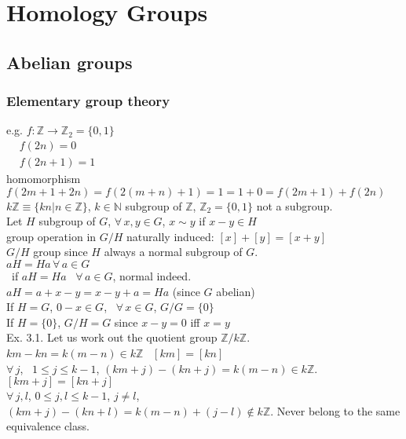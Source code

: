 \documentclass{book}
\begin{document}
\chapter{Homology Groups} 

\section{Abelian groups}

\subsection{Elementary group theory}

e.g. $f: \mathbb{Z} \to \mathbb{Z}_2 = \lbrace 0 , 1 \rbrace$ \\
$\begin{aligned}
  & f(2n) = 0 \\ 
  & f(2n+1) = 1 \end{aligned}$  \\
homomorphism $f(2m+1 +2n) = f(2(m+n) + 1) = 1 = 1 + 0 = f(2m+1) + f(2n)$ \\
$k\mathbb{Z} \equiv \lbrace kn | n \in \mathbb{Z} \rbrace$, $k \in \mathbb{N}$ subgroup of $\mathbb{Z}$, $\mathbb{Z}_2 = \lbrace 0 ,1 \rbrace$ not a subgroup.  \\

Let $H$ subgroup of $G$, $\forall \, x, y \in G$, $x\sim y$ if $x- y \in H$ \\
group operation in $G/H$ naturally induced: $[x] + [y] = [x+y]$ \\
$G/H$ group since $H$ always a normal subgroup of $G$.  \\
\quad $aH = Ha \, \forall \, a \in G$ \\
\quad \, if $aH = Ha$ \, $\forall \, a \in G$, normal indeed.  \\
\quad $aH = a + x - y = x - y + a = Ha$ (since $G$ abelian) \\

If $H = G$, $0-x \in G$, \, $\forall \, x \in G$, $G/G = \lbrace  0 \rbrace$ \\
If $H = \lbrace 0 \rbrace$, $G/H = G$ since $x-y = 0$ iff $x=y$  \\

Ex. 3.1. Let us work out the quotient group $\mathbb{Z}/ k\mathbb{Z}$.  \\
$km - kn = k (m-n) \in k \mathbb{Z}$  \, $[km ] = [kn]$ \\

$\forall \, j$, \, $1 \leq j \leq k-1$, $(km + j) - (kn +j) = k(m-n) \in k \mathbb{Z}$.  $[km + j ] = [kn +j ]$ \\
$\forall \, j, l$, $0\leq j , l \leq k -1$, $j\neq l$, $(km+j) - (kn +l) = k(m-n) + (j-l ) \notin k\mathbb{Z}$.  Never belong to the same equivalence class.  \\
\end{document}
